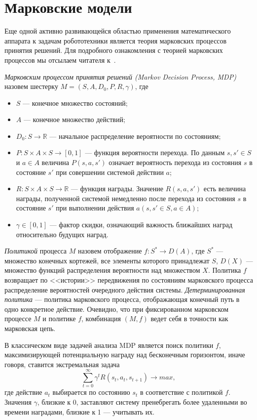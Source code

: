 \documentclass[conference]{IEEEtran}
\begin{document}
\section{Марковские модели}
Еще одной активно развивающейся областью применения математического 
аппарата к задачам робототехники является теория марковских процессов принятия 
решений. Для подробного ознакомления с теорией марковских процессов мы отсылаем 
читателя к~\cite{beranek1961ronald}.

\textit{Марковским процессом принятия решений (Markov Decision Process, MDP)} 
назовем шестерку $M = (S, A, D_0, P, R, \gamma)$, где
\begin{itemize}
  \item $S$ --- конечное множество состояний;
  \item $A$ --- конечное множество действий;
  \item $D_0: S\rightarrow\mathbb{R}$ --- начальное распределение вероятности по состояниям;
  \item $P: S\times{A}\times{S}\rightarrow[0,1]$ --- функция вероятности перехода. 
    По данным $s, s' \in S$ и $a \in A$ величина $P(s,a,s')$ означает вероятность 
    перехода из состояния $s$ в состояние $s'$ при совершении системой действии $a$;
  \item $R: S\times{A}\times{S}\rightarrow\mathbb{R}$ --- функция награды. Значение 
    $R(s,a,s')$ есть величина награды, полученной системой немедленно после 
    перехода из состояния $s$ в состояние $s'$ при выполнении действия 
    $a (s,s' \in S, a \in A)$;
  \item $\gamma \in [0,1]$ --- фактор скидки, означающий важность ближайших 
    наград относительно будущих наград.
\end{itemize}

\textit{Политикой} процесса $M$ назовем отображение $f: S^*\rightarrow{D}(A)$, где 
$S^*$ --- множество конечных кортежей, все элементы которого принадлежат $S$, 
$D(X)$ --- множество функций распределения вероятности над множеством $X$. 
Политика $f$ возвращает по <<истории>> передвижения по состояниям марковского 
процесса распределение вероятностей очередного действия системы. 
\textit{Детерминированная политика} --- политика марковского процесса, отображающая 
конечный путь в одно конкретное действие. Очевидно, что при фиксированном 
марковском процессе $M$ и политике $f$, комбинация $(M, f)$ ведет себя в точности 
как марковская цепь.

В классическом виде задачей анализа MDP является поиск политики $f$, 
максимизирующей потенциальную награду над бесконечным горизонтом, иначе говоря, 
ставится экстремальная задача
$$\sum\limits_{t=0}^\infty\gamma^t R(s_t, a_t, s_{t+1})\rightarrow{}max,$$
где действие $a_t$ выбирается по состоянию $s_t$ в соответствие с политикой $f$. 
Значения $\gamma$, близкие к 0, заставляют систему пренебрегать более удаленными 
во времени наградами, близкие к 1 --- учитывать их.
\end{document}
